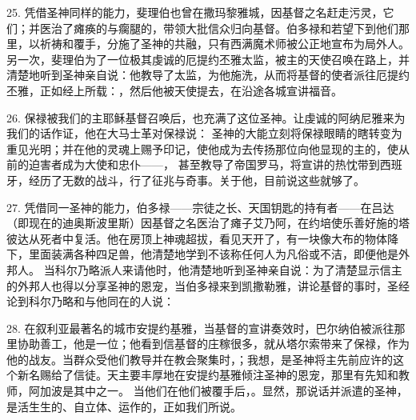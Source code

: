 25. 凭借圣神同样的能力，斐理伯也曾在撒玛黎雅城，因基督之名赶走污灵，它们；并医治了瘫痪的与瘸腿的，带领大批信众归向基督。伯多禄和若望下到他们那里，以祈祷和覆手，分施了圣神的共融，只有西满魔术师被公正地宣布为局外人。另一次，斐理伯为了一位极其虔诚的厄提约丕雅太监，被主的天使召唤在路上，并清楚地听到圣神亲自说：他教导了太监，为他施洗，从而将基督的使者派往厄提约丕雅，正如经上所载：，然后他被天使提去，在沿途各城宣讲福音。\par

26. 保禄被我们的主耶稣基督召唤后，也充满了这位圣神。让虔诚的阿纳尼雅来为我们的话作证，他在大马士革对保禄说： 圣神的大能立刻将保禄眼睛的瞎转变为重见光明；并在他的灵魂上赐予印记，使他成为去传扬那位向他显现的主的，使从前的迫害者成为大使和忠仆——， 甚至教导了帝国罗马，将宣讲的热忱带到西班牙，经历了无数的战斗，行了征兆与奇事。关于他，目前说这些就够了。\par

27. 凭借同一圣神的能力，伯多禄——宗徒之长、天国钥匙的持有者——在吕达（即现在的迪奥斯波里斯）因基督之名医治了瘫子艾乃阿，在约培使乐善好施的塔彼达从死者中复活。他在房顶上神魂超拔，看见天开了，有一块像大布的物体降下，里面装满各种四足兽，他清楚地学到不该称任何人为凡俗或不洁，即便他是外邦人。 当科尔乃略派人来请他时，他清楚地听到圣神亲自说：为了清楚显示信主的外邦人也得以分享圣神的恩宠，当伯多禄来到凯撒勒雅，讲论基督的事时，圣经论到科尔乃略和与他同在的人说：\par

28. 在叙利亚最著名的城市安提约基雅，当基督的宣讲奏效时，巴尔纳伯被派往那里协助善工，他是一位；他看到信基督的庄稼很多，就从塔尔索带来了保禄，作为他的战友。当群众受他们教导并在教会聚集时，；我想，是圣神将主先前应许的这个新名赐给了信徒。天主要丰厚地在安提约基雅倾注圣神的恩宠，那里有先知和教师，阿加波是其中之一。 当他们在他们被覆手后，。显然，那说话并派遣的圣神，是活生生的、自立体、运作的，正如我们所说。\par

